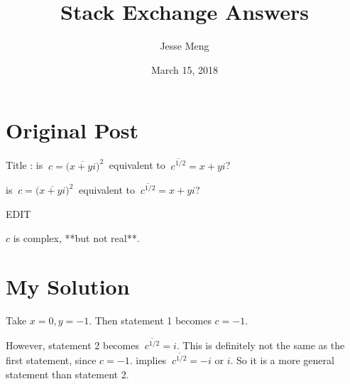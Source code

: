 \documentclass{article}
\title{Stack Exchange Answers}
\author{Jesse Meng }
\date{March 15, 2018}
\begin{document}
\maketitle

\section{Original Post}
Title : is $\ c= \big( \overline{x+yi} \big)^2 \ $ equivalent to $ \ \overline{c^{1/2}}=x+yi $?

is $\ c= \bigg( \overline{x+yi} \bigg)^2 \ $ equivalent to $ \ \overline{c^{1/2}}=x+yi $?

EDIT

$c$ is complex, **but not real**. 
\section{My Solution}
Take $x=0, y=-1$. Then statement 1 becomes $c=-1$.

However, statement 2 becomes $ \ \overline{c^{1/2}}=i$. This is definitely not the same as the first statement, since $c=-1$. implies $ \ \overline{c^{1/2}}=-i $ or $i$. So it is a more general statement than statement 2.
\end{document}
